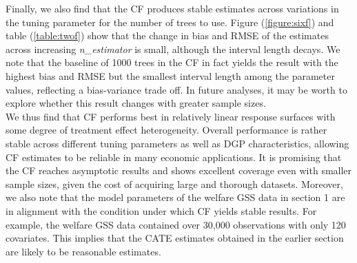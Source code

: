 \documentclass[12pt]{article}
\begin{document}
Finally, we also find that the CF produces stable estimates across variations in the tuning parameter for the number of trees to use. Figure (\ref{figure:sixf}) and table (\ref{table:twof}) show that the change in bias and RMSE of the estimates across increasing \textit{n\_estimator} is small, although the interval length decays. We note that the baseline of 1000 trees in the CF in fact yields the result with the highest bias and RMSE but the smallest interval length among the parameter values, reflecting a bias-variance trade off. In future analyses, it may be worth to explore whether this result changes with greater sample sizes. \\

We thus find that CF performs best in relatively linear response surfaces with some degree of treatment effect heterogeneity. Overall performance is rather stable across different tuning parameters as well as DGP characteristics, allowing CF estimates to be reliable in many economic applications. It is promising that the CF reaches asymptotic results and shows excellent coverage even with smaller sample sizes, given the cost of acquiring large and thorough datasets. Moreover, we also note that the model parameters of the welfare GSS data in section 1 are in alignment with the condition under which CF yields stable results. For example, the welfare GSS data contained over 30,000 observations with only 120 covariates. This implies that the CATE estimates obtained in the earlier section are likely to be reasonable estimates. 
\end{document}
